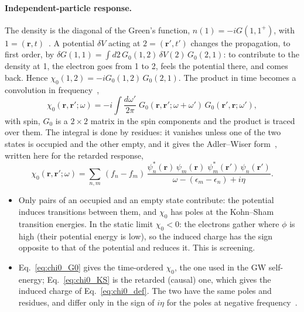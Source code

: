 \documentclass[10pt,a4paper]{paper}
\begin{document}
\paragraph{Independent-particle response.} The density is the diagonal of the Green's function,
$n(1) = -iG(1,1^+)$, with $1 = (\bm{r},t)$~\cite{strinati1988application}. A potential $\delta V$
acting at $2 = (\bm{r}',t')$ changes the propagation, to first order, by
$\delta G(1,1) = \int d2\,G_0(1,2)\,\delta V(2)\,G_0(2,1)$: to contribute to the density at 1, the electron goes from
1 to 2, feels the potential there, and comes back. Hence $\chi_0(1,2) = -iG_0(1,2)\,G_0(2,1)$. 
The product in time becomes a convolution in frequency~\cite{golze2019gw},
\begin{equation}
\chi_0(\bm{r},\bm{r}';\omega) = -i\int\frac{d\omega'}{2\pi}\;G_0(\bm{r},\bm{r}';\omega + \omega')\,
G_0(\bm{r}',\bm{r};\omega') ,
\label{eq:chi0_G0}
\end{equation}
with spin, $G_0$ is a $2 \times 2$ matrix in the spin components and the product is traced over them. The integral is done by residues: it vanishes unless one of the two states is occupied and the other empty, and it gives the
Adler--Wiser form~\cite{golze2019gw,amblard2024static}, written here for the retarded response,
\begin{equation}
\chi_0(\bm{r},\bm{r}';\omega) = \sum_{n,m}\,(f_n - f_m)\,
\frac{\psi_n^*(\bm{r})\,\psi_m(\bm{r})\;\psi_m^*(\bm{r}')\,\psi_n(\bm{r}')}{\omega - (\epsilon_m - \epsilon_n) + i\eta} .
\label{eq:chi0_KS}
\end{equation}
\begin{itemize}
\item Only pairs of an occupied and an empty state contribute: the potential induces transitions between them, and
  $\chi_0$ has poles at the Kohn--Sham transition energies. In the static limit $\chi_0 < 0$: the electrons gather
  where $\phi$ is high (their potential energy is low), so the induced charge has the sign opposite to that of
  the potential and reduces it. This is screening.
\item Eq.~\eqref{eq:chi0_G0} gives the time-ordered $\chi_0$, the one used in the GW self-energy;
  Eq.~\eqref{eq:chi0_KS} is the retarded (causal) one, which gives the induced charge of Eq.~\eqref{eq:chi0_def}. The
  two have the same poles and residues, and differ only in the sign of $i\eta$ for the poles at negative
  frequency~\cite{golze2019gw,amblard2024static}.
\end{itemize}
\end{document}
